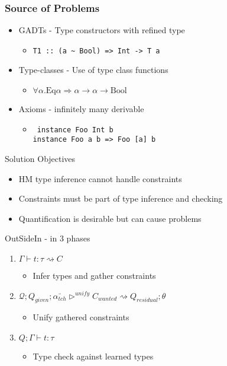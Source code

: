 \documentclass{beamer}
\begin{document}
\begin{frame}[fragile]
\frametitle{Source of Problems}
\begin{itemize}
\item GADTs - Type constructors with refined type
\begin{itemize}
\item \begin{lstlisting}
T1 :: (a ~ Bool) => Int -> T a
\end{lstlisting}
\end{itemize}
\item Type-classes - Use of type class functions
\begin{itemize}
\item $\forall \alpha . \mbox{Eq} \alpha \Rightarrow \alpha \rightarrow \alpha \rightarrow \mbox{Bool}$
\end{itemize}
\item Axioms - infinitely many derivable 
\begin{itemize}
\item \begin{lstlisting} instance Foo Int b
instance Foo a b => Foo [a] b
\end{lstlisting}
\end{itemize}
\end{itemize}
\end{frame}

\begin{frame}{Solution Objectives}
\begin{itemize}
\item HM type inference cannot handle constraints
\item Constraints must be part of type inference and checking
\item Quantification is desirable but can cause problems
\end{itemize}
\end{frame}

\begin{frame}{OutSideIn - in 3 phases}
\begin{enumerate}
\item $\Gamma \vdash t : \tau \rightsquigarrow C$
   \begin{itemize}
   \item Infer types and gather constraints
   \end{itemize}
\item $\mathcal{Q};Q_{given};\bar{\alpha_{tch}} \triangleright^{unify} C_{wanted} \rightsquigarrow Q_{residual};\theta$
   \begin{itemize}
   \item Unify gathered constraints
   \end{itemize}
\item $Q;\Gamma \vdash t : \tau$
   \begin{itemize}
   \item Type check against learned types
   \end{itemize}
\end{enumerate}
\end{frame}
\end{document}
